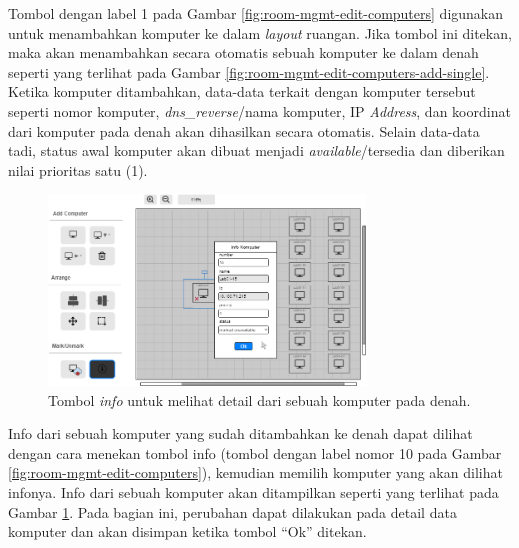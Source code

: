 \documentclass[a4paper,twoside]{article}
\begin{document}
\begin{enumerate}
\begin{itemize}
\begin{itemize}
                
                Tombol dengan label 1 pada Gambar \ref{fig:room-mgmt-edit-computers} digunakan untuk menambahkan komputer ke dalam \textit{layout} ruangan. Jika tombol ini ditekan, maka akan menambahkan secara otomatis sebuah komputer ke dalam denah seperti yang terlihat pada Gambar \ref{fig:room-mgmt-edit-computers-add-single}. Ketika komputer ditambahkan, data-data terkait dengan komputer tersebut seperti nomor komputer, \textit{dns\_reverse}/nama komputer, IP \textit{Address}, dan koordinat dari komputer pada denah akan dihasilkan secara otomatis. Selain data-data tadi, status awal komputer akan dibuat menjadi \textit{available}/tersedia dan diberikan nilai prioritas satu (1).
                
                  \begin{figure}[H]
                    \centering
                    \includegraphics[width=0.75\textwidth]{images/ui designs/room-management/info.png}
                    \caption{Tombol \textit{info} untuk melihat detail dari sebuah komputer pada denah.}
                    \label{fig:room-mgmt-edit-computers-info}
                \end{figure}
                
                Info dari sebuah komputer yang sudah ditambahkan ke denah dapat dilihat dengan cara menekan tombol info (tombol dengan label nomor 10 pada Gambar \ref{fig:room-mgmt-edit-computers}), kemudian memilih komputer yang akan dilihat infonya. Info dari sebuah komputer akan ditampilkan seperti yang terlihat pada Gambar \ref{fig:room-mgmt-edit-computers-info}. Pada bagian ini, perubahan dapat dilakukan pada detail data komputer dan akan disimpan ketika tombol ``Ok'' ditekan.
                

\end{itemize}
\end{itemize}
\end{enumerate}
\end{document}
